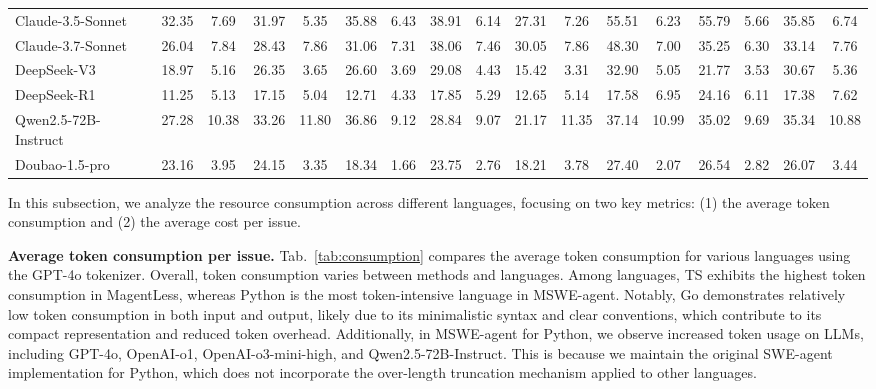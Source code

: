 \documentclass[11pt, a4paper, logo, copyright, nonumbering]{seed}
\newcommand{\magentless}{MagentLess\xspace}
\newcommand{\sweagent}{SWE-agent\xspace}
\newcommand{\msweagent}{MSWE-agent\xspace}
\begin{document}
\begin{table}[t]
{\begin{tabular}{l|cc|cc|cc|cc|cc|cc|cc|cc}
    Claude-3.5-Sonnet & 32.35 & 7.69 & 31.97 & 5.35 & 35.88 & 6.43 & 38.91 & 6.14 & 27.31 & 7.26 & 55.51 & 6.23 & 55.79 & 5.66 & 35.85 & 6.74\\
    Claude-3.7-Sonnet & 26.04 & 7.84 & 28.43 & 7.86 & 31.06 & 7.31 & 38.06 & 7.46 & 30.05 & 7.86 & 48.30 & 7.00 & 35.25 & 6.30 & 33.14 & 7.76\\
    DeepSeek-V3 & 18.97 & 5.16 & 26.35 & 3.65 & 26.60 & 3.69 & 29.08 & 4.43 & 15.42 & 3.31 & 32.90 & 5.05 & 21.77 & 3.53 & 30.67 & 5.36\\
    DeepSeek-R1 & 11.25 & 5.13 & 17.15 & 5.04 & 12.71 & 4.33 & 17.85 & 5.29 & 12.65 & 5.14 & 17.58 & 6.95 & 24.16 & 6.11 & 17.38 & 7.62\\
    Qwen2.5-72B-Instruct & 27.28 & 10.38 & 33.26 & 11.80 & 36.86 & 9.12 & 28.84 & 9.07 & 21.17 & 11.35 & 37.14 & 10.99 & 35.02 & 9.69 & 35.34 & 10.88\\
    Doubao-1.5-pro & 23.16 & 3.95 & 24.15 & 3.35 & 18.34 & 1.66 & 23.75 & 2.76 & 18.21 & 3.78 & 27.40 & 2.07 & 26.54 & 2.82 & 26.07 & 3.44\\
    \bottomrule
    \end{tabular}
}
\end{table}

In this subsection, we analyze the resource consumption across different languages, focusing on two key metrics: (1) the average token consumption and (2) the average cost per issue.

\textbf{Average token consumption per issue.}
Tab.~\ref{tab:consumption} compares the average token consumption for various languages using the GPT-4o tokenizer.
Overall, token consumption varies between methods and languages. 
Among languages, TS exhibits the highest token consumption in \magentless, whereas Python is the most token-intensive language in \msweagent. 
Notably, Go demonstrates relatively low token consumption in both input and output, likely due to its minimalistic syntax and clear conventions, which contribute to its compact representation and reduced token overhead. 
Additionally, in \msweagent for Python, we observe increased token usage on LLMs, including GPT-4o, OpenAI-o1, OpenAI-o3-mini-high, and Qwen2.5-72B-Instruct. 
This is because we maintain the original \sweagent implementation for Python, which does not incorporate the over-length truncation mechanism applied to other languages.
\end{document}

